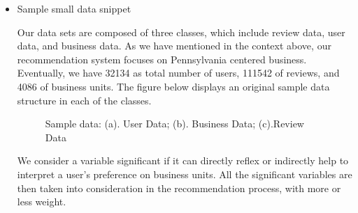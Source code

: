 \begin{itemize} 
\item{Sample small data snippet}

Our data sets are composed of three classes, which include review data, user data, and business data. As we have mentioned in the context above, our recommendation system focuses on Pennsylvania centered business. Eventually, we have 32134 as total number of users, 111542 of reviews, and 4086 of business units. The figure below displays an original sample data structure in each of the classes.

\begin{figure}[h] 
		\advance\rightskip-1cm
		{}
		\caption{Sample data: (a). User Data; (b). Business Data; (c).Review Data}\label{fig:Sample_Data}
\end{figure}

\par
We consider a variable significant if it can directly reflex or indirectly help to interpret a user's preference on business units. All the significant variables are then taken into consideration in the recommendation process, with more or less weight. 


\end{itemize}
